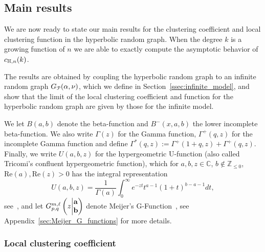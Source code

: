 \subsection{Main results}\label{ssec:main_results}

We are now ready to state our main results for the clustering coefficient and local clustering function in the hyperbolic random graph. When the degree $k$ is a growing function of $n$ we are able to exactly compute the asymptotic behavior of $c_{\H,n}(k)$. 

The results are obtained by coupling the hyperbolic random graph to an infinite random graph $G_\Pcal(\alpha,\nu)$, which we define in Section~\ref{ssec:infinite_model}, and show that the limit of the local clustering coefficient and function for the hyperbolic random graph are given by those for the infinite model. 

We let $B(a,b)$ denote the beta-function and $B^-(x,a,b)$ the lower incomplete beta-function. We also write $\Gamma(z)$ for the Gamma function, $\Gamma^+(q,z)$ for the  incomplete Gamma function and define $\Gamma^\ast(q,z) := \Gamma^+(1 + q, z) + \Gamma^+(q, z)$. 
Finally, we write $U(a,b,z)$ for the hypergeometric U-function (also called Tricomi's confluent hypergeometric function), which for $a,b,z\in \mathbb{C}$, $b \not \in \mathbb{Z}_{\leq 0}$, $\mathrm{Re}(a), \mathrm{Re}(z) >0$ has the integral representation 
\[
	U(a,b,z) = \frac{1}{\Gamma(a)} \int_0^\infty e^{-zt} t^{a-1} (1+t)^{b-a-1} dt,
\] 
see~\cite[p.255 Equation (2)]{erdelyi1953higher}, and let $\MeijerGnew{m}{\ell}{p}{q}{{\bf a}}{{\bf b}}{z}$ denote Meijer's G-Function~\cite{meijer1946gfunction}, see Appendix~\ref{sec:Meijer_G_functions} for more details.


\subsubsection{Local clustering coefficient}

